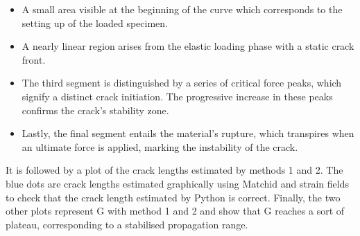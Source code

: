 \documentclass[3p,times,procedia]{elsarticle}
\begin{document}
\begin{itemize}
	\item A small area visible at the beginning of the curve which corresponds to the setting up of the loaded specimen. 
	\item A nearly linear region arises from the elastic loading phase with a static crack front.
	\item The third segment is distinguished by a series of critical force peaks, which signify a distinct crack initiation. The progressive increase in these peaks confirms the crack's stability zone.
	\item Lastly, the final segment entails the material's rupture, which transpires when an ultimate force is applied, marking the instability of the crack.
\end{itemize}

It is followed by a plot of the crack lengths estimated by methods 1 and 2. The blue dots are crack lengths estimated graphically using Matchid and strain fields to check that the crack length estimated by Python is correct. Finally, the two other plots represent G with method 1 and 2 and show that G reaches a sort of plateau, corresponding to a stabilised propagation range.
\end{document}
